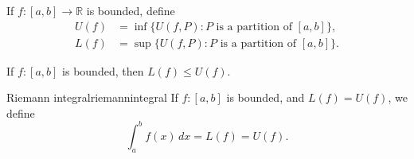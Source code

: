 \begin{defn}{}{}
	If \(f\colon [a, b] \to \mathbb{R}\) is bounded, define
	\begin{align*}
		U(f) &= \inf\{U(f, P) : P \text{ is a partition of } [a, b]\}, \\
		L(f) &= \sup\{U(f, P) : P \text{ is a partition of } [a, b]\}.
	\end{align*}
\end{defn}

\begin{prop}{}{}
	If \(f \colon [a, b]\) is bounded, then \(L(f) \leq U(f)\).
\end{prop}

\begin{defn}{Riemann integral}{riemannintegral}
	If \(f \colon [a, b]\) is bounded, and \(L(f) = U(f)\), we define \[
		\int_a^b f(x)\,dx = L(f) = U(f).
	\]
\end{defn}

